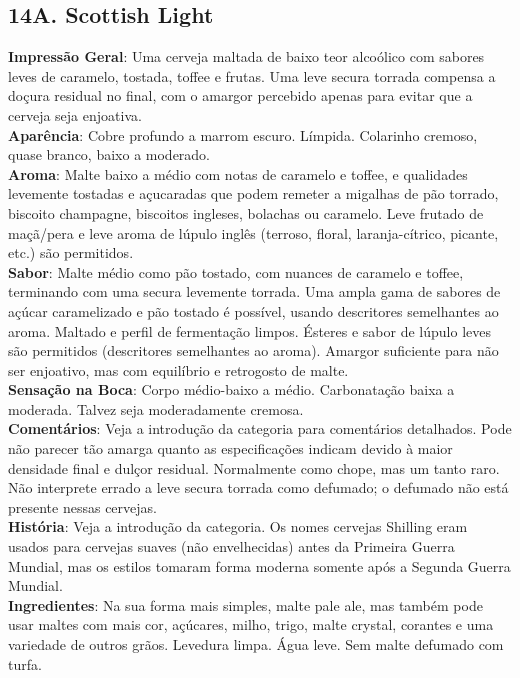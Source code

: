 \subsection*{14A. Scottish Light}
\textbf{Impressão Geral}: Uma cerveja maltada de baixo teor alcoólico com sabores leves de caramelo, tostada, toffee e frutas. Uma leve secura torrada compensa a doçura residual no final, com o amargor percebido apenas para evitar que a cerveja seja enjoativa. \\
\textbf{Aparência}: Cobre profundo a marrom escuro. Límpida. Colarinho cremoso, quase branco, baixo a moderado. \\
\textbf{Aroma}: Malte baixo a médio com notas de caramelo e toffee, e qualidades levemente tostadas e açucaradas que podem remeter a migalhas de pão torrado, biscoito champagne, biscoitos ingleses, bolachas ou caramelo. Leve frutado de maçã/pera e leve aroma de lúpulo inglês (terroso, floral, laranja-cítrico, picante, etc.) são permitidos. \\
\textbf{Sabor}: Malte médio como pão tostado, com nuances de caramelo e toffee, terminando com uma secura levemente torrada. Uma ampla gama de sabores de açúcar caramelizado e pão tostado é possível, usando descritores semelhantes ao aroma. Maltado e perfil de fermentação limpos. Ésteres e sabor de lúpulo leves são permitidos (descritores semelhantes ao aroma). Amargor suficiente para não ser enjoativo, mas com equilíbrio e retrogosto de malte. \\
\textbf{Sensação na Boca}: Corpo médio-baixo a médio. Carbonatação baixa a moderada. Talvez seja moderadamente cremosa. \\
\textbf{Comentários}: Veja a introdução da categoria para comentários detalhados. Pode não parecer tão amarga quanto as especificações indicam devido à maior densidade final e dulçor residual. Normalmente como chope, mas um tanto raro. Não interprete errado a leve secura torrada como defumado; o defumado não está presente nessas cervejas. \\
\textbf{História}: Veja a introdução da categoria. Os nomes cervejas Shilling eram usados para cervejas suaves (não envelhecidas) antes da Primeira Guerra Mundial, mas os estilos tomaram forma moderna somente após a Segunda Guerra Mundial. \\
\textbf{Ingredientes}: Na sua forma mais simples, malte pale ale, mas também pode usar maltes com mais cor, açúcares, milho, trigo, malte crystal, corantes e uma variedade de outros grãos. Levedura limpa. Água leve. Sem malte defumado com turfa. \\
